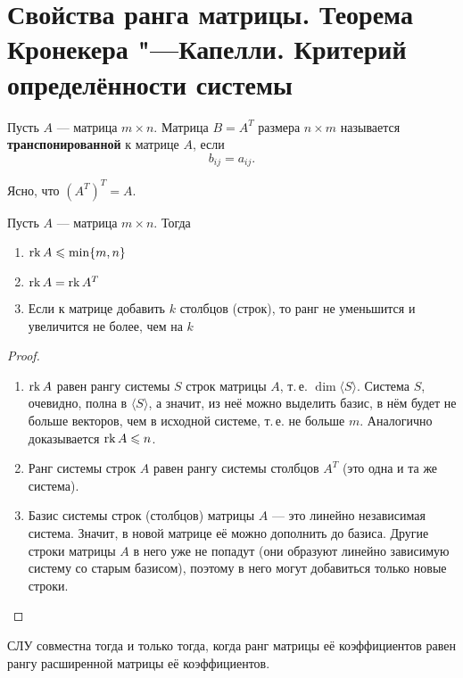 \section{Свойства ранга матрицы. Теорема Кронекера "---Капелли. Критерий определённости системы}

\begin{definition}
    Пусть $A$ --- матрица $m \times n$. Матрица $B = A^T$ размера $n \times m$ называется \textbf{транспонированной} к матрице $A$, если
    $$
    b_{ij} = a_{ij}.
    $$
\end{definition}

\begin{remark}
    Ясно, что $(A^T)^T = A$.
\end{remark}

\begin{theorem}
    Пусть $A$ --- матрица $m \times n$. Тогда
    \begin{enumerate}[nolistsep]
        \item $\mathrm{rk}\, A \leqslant \min\{m, n\}$
        \item $\mathrm{rk}\, A = \mathrm{rk}\, A^T$
        \item Если к матрице добавить $k$ столбцов (строк), то ранг не уменьшится и увеличится не более, чем на $k$
    \end{enumerate}
\end{theorem}

\begin{proof}
    \begin{enumerate}[nolistsep]
        \item $\mathrm{rk}\, A$ равен рангу системы $S$ строк матрицы $A$, т.\,е. $\dim\langle S\rangle$. Система $S$, очевидно, полна в $\langle S\rangle$, а значит, из неё можно выделить базис, в нём будет не больше векторов, чем в исходной системе, т.\,е. не больше $m$. Аналогично доказывается $\mathrm{rk}\, A \leqslant n$.
        \item Ранг системы строк $A$ равен рангу системы столбцов $A^T$ (это одна и та же система).
        \item Базис системы строк (столбцов) матрицы $A$ --- это линейно независимая система. Значит, в новой матрице её можно дополнить до базиса. Другие строки матрицы $A$ в него уже не попадут (они образуют линейно зависимую систему со старым базисом), поэтому в него могут добавиться только новые строки.
    \end{enumerate}
\end{proof}

\begin{theorem}
    СЛУ совместна тогда и только тогда, когда ранг матрицы её коэффициентов равен рангу расширенной матрицы её коэффициентов.
\end{theorem}

